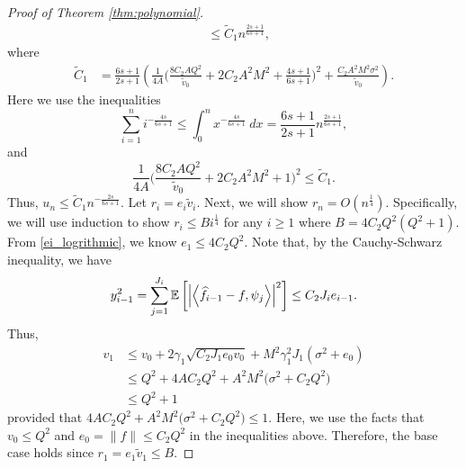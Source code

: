 \begin{proof}[Proof of Theorem \ref{thm:polynomial}]
\begin{align}
    &\leq \tilde C_1 n^{\frac{2s+1}{6s+1}},
\end{align}
where 
\begin{align*}
    \tilde C_1 &= \frac{6s+1}{2s+1}\left(\frac{1}{4A} \bigg(\frac{8C_2AQ^2}{\tilde v_0} + 2C_2A^2M^2+\frac{4s+1}{6s+1} \bigg)^2 + \frac{C_2A^2M^2\sigma^2}{\tilde v_0} \right).
\end{align*}
Here we use the inequalities $$\sum_{i=1}^n i^{-\frac{4s}{6s+1}} \leq \int_0^n x^{-\frac{4s}{6s+1}}~dx = \frac{6s+1}{2s+1}n^{\frac{2s+1}{6s+1}},$$ and
$$
\frac{1}{4A} \bigg(\frac{8C_2AQ^2}{\tilde v_0} + 2C_2A^2M^2+1 \bigg)^2 \leq \tilde C_1.
$$
Thus, $u_n \leq  \tilde C_1n^{-\frac{2s}{6s+1}}$. Let $r_i = e_i\tilde v_i$. Next, we will show $r_n = O\left(n^{\frac{1}{4}}\right)$. Specifically, we will use induction to show $r_i \leq Bi^{\frac{1}{4}}$ for any $i \geq 1$ where $B = 4C_2Q^2(Q^2+1)$. From \eqref{ei_logrithmic}, we know $e_1 \leq 4C_2Q^2$. Note that, by the Cauchy-Schwarz inequality, we have
\begin{align}
    y_{i-1}^2 = \sum_{j=1}^{J_i}\mathbb{E}\left[\left|\left\langle \widehat{f}_{i-1}-f,\psi_{j} \right\rangle\right|^2\right] \leq C_2J_ie_{i-1}.
\end{align}
Thus,  
\begin{align}
    v_1 &\leq v_0 + 2\gamma_1\sqrt{C_2J_1e_0v_0} + M^2\gamma_1^2J_1(\sigma^2 + e_0)\\
    & \leq Q^2 + 4AC_2Q^2 + A^2M^2\big(\sigma^2 + C_2Q^2\big)\\ &\leq Q^2+1
\end{align}
provided that $4AC_2Q^2 + A^2M^2\big(\sigma^2 + C_2Q^2\big) \leq 1$. Here, we use the facts that $v_0 \leq  Q^2$ and $e_0 = \|f\| \leq  C_2Q^2$ in the  inequalities above. Therefore, the base case holds since $r_1 = e_1\tilde v_1 \leq B$.   


\end{proof}
